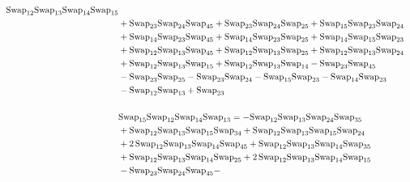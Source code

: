 \documentclass[12pt,dvipsnames,accepted=2016-08-18,a4paper,onecolumn]{quantumarticle}
\numberwithin{equation}{section}
\theoremstyle{definition}
\begin{document}
\begin{align*}
        \textnormal{Swap}_{12} \textnormal{Swap}_{13} \textnormal{Swap}_{14} \textnormal{Swap}_{15} \\ & + \textnormal{Swap}_{23} \textnormal{Swap}_{24} \textnormal{Swap}_{45} + \textnormal{Swap}_{23} \textnormal{Swap}_{24} \textnormal{Swap}_{25} + \textnormal{Swap}_{15} \textnormal{Swap}_{23} \textnormal{Swap}_{24}\\& + \textnormal{Swap}_{14} \textnormal{Swap}_{23} \textnormal{Swap}_{45}
        + \textnormal{Swap}_{14} \textnormal{Swap}_{23} \textnormal{Swap}_{25} + \textnormal{Swap}_{14} \textnormal{Swap}_{15} \textnormal{Swap}_{23}\\ & + \textnormal{Swap}_{12} \textnormal{Swap}_{13} \textnormal{Swap}_{45} + \textnormal{Swap}_{12} \textnormal{Swap}_{13} \textnormal{Swap}_{25} + \textnormal{Swap}_{12} \textnormal{Swap}_{13} \textnormal{Swap}_{24}\\ & +
        \textnormal{Swap}_{12} \textnormal{Swap}_{13} \textnormal{Swap}_{15} + \textnormal{Swap}_{12} \textnormal{Swap}_{13} \textnormal{Swap}_{14} - \textnormal{Swap}_{23} \textnormal{Swap}_{45}\\ & - \textnormal{Swap}_{23} \textnormal{Swap}_{25} - \textnormal{Swap}_{23} \textnormal{Swap}_{24} - \textnormal{Swap}_{15} \textnormal{Swap}_{23} -
        \textnormal{Swap}_{14} \textnormal{Swap}_{23}\\ & - \textnormal{Swap}_{12} \textnormal{Swap}_{13} + \textnormal{Swap}_{23}\\
        \\
        &\textnormal{Swap}_{15}   \textnormal{Swap}_{12}   \textnormal{Swap}_{14}   \textnormal{Swap}_{13} = -\textnormal{Swap}_{12} \textnormal{Swap}_{13} \textnormal{Swap}_{24} \textnormal{Swap}_{35}\\ & + \textnormal{Swap}_{12} \textnormal{Swap}_{13} \textnormal{Swap}_{15} \textnormal{Swap}_{34} + \textnormal{Swap}_{12} \textnormal{Swap}_{13} \textnormal{Swap}_{15} \textnormal{Swap}_{24}\\ & + 2\,\textnormal{Swap}_{12} \textnormal{Swap}_{13} \textnormal{Swap}_{14} \textnormal{Swap}_{45} +
        \textnormal{Swap}_{12} \textnormal{Swap}_{13} \textnormal{Swap}_{14} \textnormal{Swap}_{35}\\ & + \textnormal{Swap}_{12} \textnormal{Swap}_{13} \textnormal{Swap}_{14} \textnormal{Swap}_{25} + 2\,\textnormal{Swap}_{12} \textnormal{Swap}_{13} \textnormal{Swap}_{14} \textnormal{Swap}_{15}\\ & - \textnormal{Swap}_{23} \textnormal{Swap}_{24} \textnormal{Swap}_{45} -

\end{align*}
\end{document}
